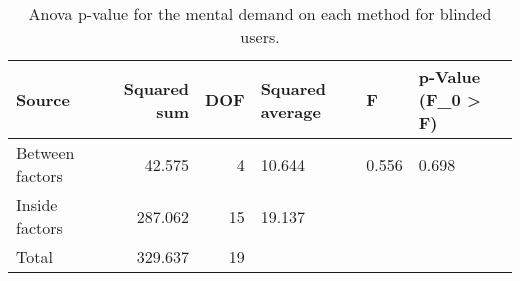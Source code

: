 
\begin{table}[!htb]
\centering
\caption{Anova p-value for the mental demand on each method for blinded users.}
\label{tab:anova_mental_demand}
\begin{tabular}{lrrlll}
\toprule
         Source &  Squared sum &  DOF & Squared average &     F & p-Value (F\_0 > F) \\
\midrule
Between factors &       42.575 &    4 &          10.644 & 0.556 &             0.698 \\
 Inside factors &      287.062 &   15 &          19.137 &       &                   \\
          Total &      329.637 &   19 &                 &       &                   \\
\bottomrule
\end{tabular}
\end{table}

